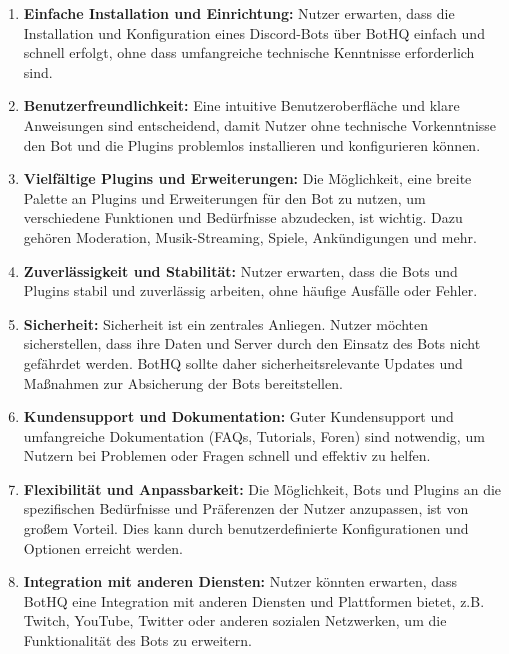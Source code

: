 \begin{enumerate}
  \item \textbf{Einfache Installation und Einrichtung:}
  Nutzer erwarten, dass die Installation und Konfiguration eines Discord-Bots über BotHQ einfach und schnell erfolgt, ohne dass umfangreiche technische Kenntnisse erforderlich sind.

  \item \textbf{Benutzerfreundlichkeit:}
  Eine intuitive Benutzeroberfläche und klare Anweisungen sind entscheidend, damit Nutzer ohne technische Vorkenntnisse den Bot und die Plugins problemlos installieren und konfigurieren können.

  \item \textbf{Vielfältige Plugins und Erweiterungen:}
  Die Möglichkeit, eine breite Palette an Plugins und Erweiterungen für den Bot zu nutzen, um verschiedene Funktionen und Bedürfnisse abzudecken, ist wichtig. Dazu gehören Moderation, Musik-Streaming, Spiele, Ankündigungen und mehr.

  \item \textbf{Zuverlässigkeit und Stabilität:}
  Nutzer erwarten, dass die Bots und Plugins stabil und zuverlässig arbeiten, ohne häufige Ausfälle oder Fehler.

  \item \textbf{Sicherheit:}
  Sicherheit ist ein zentrales Anliegen. Nutzer möchten sicherstellen, dass ihre Daten und Server durch den Einsatz des Bots nicht gefährdet werden. BotHQ sollte daher sicherheitsrelevante Updates und Maßnahmen zur Absicherung der Bots bereitstellen.

  \item \textbf{Kundensupport und Dokumentation:}
  Guter Kundensupport und umfangreiche Dokumentation (FAQs, Tutorials, Foren) sind notwendig, um Nutzern bei Problemen oder Fragen schnell und effektiv zu helfen.

  \item \textbf{Flexibilität und Anpassbarkeit:}
  Die Möglichkeit, Bots und Plugins an die spezifischen Bedürfnisse und Präferenzen der Nutzer anzupassen, ist von großem Vorteil. Dies kann durch benutzerdefinierte Konfigurationen und Optionen erreicht werden.

  \item \textbf{Integration mit anderen Diensten:}
  Nutzer könnten erwarten, dass BotHQ eine Integration mit anderen Diensten und Plattformen bietet, z.B. Twitch, YouTube, Twitter oder anderen sozialen Netzwerken, um die Funktionalität des Bots zu erweitern.
\end{enumerate}

